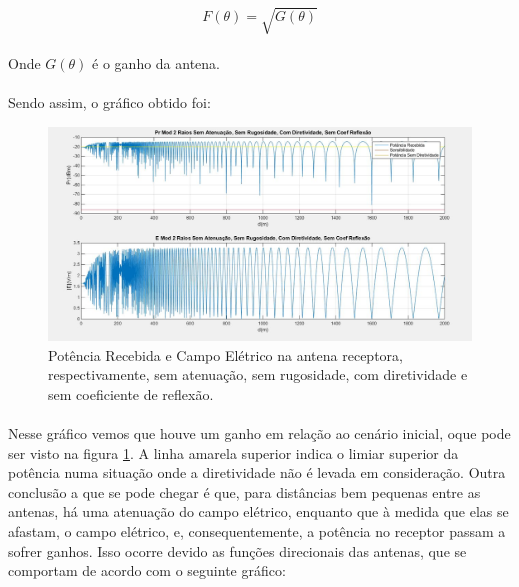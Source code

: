 \begin{equation}
\label{F}
    F(\theta) = \sqrt{G(\theta)}
\end{equation}

\paragraph{}Onde $G(\theta)$ é o ganho da antena.

\paragraph{}Sendo assim, o gráfico obtido foi:



\FloatBarrier
\begin{figure}[!htp]
\centering
\includegraphics[scale = 0.3]{Figuras/SA_SR_CD_SCR_2.JPG}
\caption{Potência Recebida e Campo Elétrico na antena receptora, respectivamente, sem atenuação, sem rugosidade, com diretividade e sem coeficiente de reflexão.}
\label{Diretividade}
\end{figure}
\FloatBarrier

\paragraph{}Nesse gráfico vemos que houve um ganho em relação ao cenário inicial, oque pode ser visto na figura \ref{Diretividade}. A linha amarela superior indica o limiar superior da potência numa situação onde a diretividade não é levada em consideração. Outra conclusão a que se pode chegar é que, para distâncias bem pequenas entre as antenas, há uma atenuação do campo elétrico, enquanto que à medida que elas se afastam, o campo elétrico, e, consequentemente, a potência no receptor passam a sofrer ganhos. Isso ocorre devido as funções direcionais das antenas, que se comportam de acordo com o seguinte gráfico:


